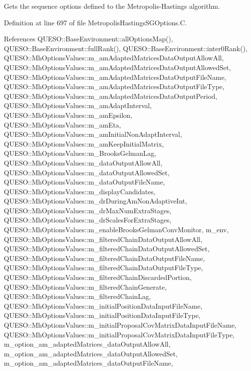 Gets the sequence options defined to the Metropolis-\/\-Hastings algorithm. 



Definition at line 697 of file Metropolis\-Hastings\-S\-G\-Options.\-C.



References Q\-U\-E\-S\-O\-::\-Base\-Environment\-::all\-Options\-Map(), Q\-U\-E\-S\-O\-::\-Base\-Environment\-::full\-Rank(), Q\-U\-E\-S\-O\-::\-Base\-Environment\-::inter0\-Rank(), Q\-U\-E\-S\-O\-::\-Mh\-Options\-Values\-::m\-\_\-am\-Adapted\-Matrices\-Data\-Output\-Allow\-All, Q\-U\-E\-S\-O\-::\-Mh\-Options\-Values\-::m\-\_\-am\-Adapted\-Matrices\-Data\-Output\-Allowed\-Set, Q\-U\-E\-S\-O\-::\-Mh\-Options\-Values\-::m\-\_\-am\-Adapted\-Matrices\-Data\-Output\-File\-Name, Q\-U\-E\-S\-O\-::\-Mh\-Options\-Values\-::m\-\_\-am\-Adapted\-Matrices\-Data\-Output\-File\-Type, Q\-U\-E\-S\-O\-::\-Mh\-Options\-Values\-::m\-\_\-am\-Adapted\-Matrices\-Data\-Output\-Period, Q\-U\-E\-S\-O\-::\-Mh\-Options\-Values\-::m\-\_\-am\-Adapt\-Interval, Q\-U\-E\-S\-O\-::\-Mh\-Options\-Values\-::m\-\_\-am\-Epsilon, Q\-U\-E\-S\-O\-::\-Mh\-Options\-Values\-::m\-\_\-am\-Eta, Q\-U\-E\-S\-O\-::\-Mh\-Options\-Values\-::m\-\_\-am\-Initial\-Non\-Adapt\-Interval, Q\-U\-E\-S\-O\-::\-Mh\-Options\-Values\-::m\-\_\-am\-Keep\-Initial\-Matrix, Q\-U\-E\-S\-O\-::\-Mh\-Options\-Values\-::m\-\_\-\-Brooks\-Gelman\-Lag, Q\-U\-E\-S\-O\-::\-Mh\-Options\-Values\-::m\-\_\-data\-Output\-Allow\-All, Q\-U\-E\-S\-O\-::\-Mh\-Options\-Values\-::m\-\_\-data\-Output\-Allowed\-Set, Q\-U\-E\-S\-O\-::\-Mh\-Options\-Values\-::m\-\_\-data\-Output\-File\-Name, Q\-U\-E\-S\-O\-::\-Mh\-Options\-Values\-::m\-\_\-display\-Candidates, Q\-U\-E\-S\-O\-::\-Mh\-Options\-Values\-::m\-\_\-dr\-During\-Am\-Non\-Adaptive\-Int, Q\-U\-E\-S\-O\-::\-Mh\-Options\-Values\-::m\-\_\-dr\-Max\-Num\-Extra\-Stages, Q\-U\-E\-S\-O\-::\-Mh\-Options\-Values\-::m\-\_\-dr\-Scales\-For\-Extra\-Stages, Q\-U\-E\-S\-O\-::\-Mh\-Options\-Values\-::m\-\_\-enable\-Brooks\-Gelman\-Conv\-Monitor, m\-\_\-env, Q\-U\-E\-S\-O\-::\-Mh\-Options\-Values\-::m\-\_\-filtered\-Chain\-Data\-Output\-Allow\-All, Q\-U\-E\-S\-O\-::\-Mh\-Options\-Values\-::m\-\_\-filtered\-Chain\-Data\-Output\-Allowed\-Set, Q\-U\-E\-S\-O\-::\-Mh\-Options\-Values\-::m\-\_\-filtered\-Chain\-Data\-Output\-File\-Name, Q\-U\-E\-S\-O\-::\-Mh\-Options\-Values\-::m\-\_\-filtered\-Chain\-Data\-Output\-File\-Type, Q\-U\-E\-S\-O\-::\-Mh\-Options\-Values\-::m\-\_\-filtered\-Chain\-Discarded\-Portion, Q\-U\-E\-S\-O\-::\-Mh\-Options\-Values\-::m\-\_\-filtered\-Chain\-Generate, Q\-U\-E\-S\-O\-::\-Mh\-Options\-Values\-::m\-\_\-filtered\-Chain\-Lag, Q\-U\-E\-S\-O\-::\-Mh\-Options\-Values\-::m\-\_\-initial\-Position\-Data\-Input\-File\-Name, Q\-U\-E\-S\-O\-::\-Mh\-Options\-Values\-::m\-\_\-initial\-Position\-Data\-Input\-File\-Type, Q\-U\-E\-S\-O\-::\-Mh\-Options\-Values\-::m\-\_\-initial\-Proposal\-Cov\-Matrix\-Data\-Input\-File\-Name, Q\-U\-E\-S\-O\-::\-Mh\-Options\-Values\-::m\-\_\-initial\-Proposal\-Cov\-Matrix\-Data\-Input\-File\-Type, m\-\_\-option\-\_\-am\-\_\-adapted\-Matrices\-\_\-data\-Output\-Allow\-All, m\-\_\-option\-\_\-am\-\_\-adapted\-Matrices\-\_\-data\-Output\-Allowed\-Set, m\-\_\-option\-\_\-am\-\_\-adapted\-Matrices\-\_\-data\-Output\-File\-Name, 